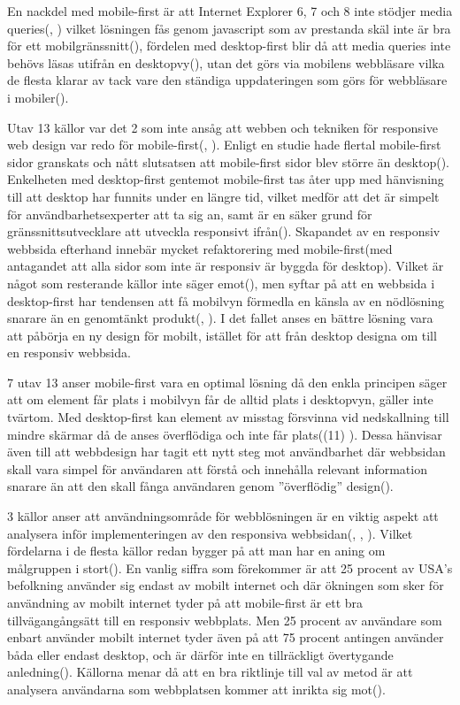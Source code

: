 \documentclass[11pt]{article}
\begin{document}
 En nackdel med mobile-first är att Internet Explorer 6, 7 och 8 inte stödjer media queries(\cite{marcuspope}, \cite{neocreo}) vilket lösningen fås genom javascript som av prestanda skäl inte är bra för ett mobilgränssnitt(\cite{responsivedesign}), fördelen med desktop-first blir då att media queries inte behövs läsas utifrån en desktopvy(\cite{neocreo}), utan det görs via mobilens webbläsare vilka de flesta klarar av tack vare den ständiga uppdateringen som görs för webbläsare i mobiler(\cite{webinsation}).
 
 Utav 13 källor var det 2 som inte ansåg att webben och tekniken för responsive web design var redo för mobile-first(\cite{cloudfour}, \cite{armstrong}). Enligt en studie hade flertal mobile-first sidor granskats och nått slutsatsen att mobile-first sidor blev större än desktop(\cite{cloudfour}). Enkelheten med desktop-first gentemot mobile-first tas åter upp med hänvisning till att desktop har funnits under en längre tid, vilket medför att det är simpelt för användbarhetsexperter att ta sig an, samt är en säker grund för gränssnittsutvecklare att utveckla responsivt ifrån(\cite{armstrong}). Skapandet av en responsiv webbsida efterhand innebär mycket refaktorering med mobile-first(med antagandet att alla sidor som inte är responsiv är byggda för desktop). Vilket är något som resterande källor inte säger emot(\cite{neocreo}), men syftar på att en webbsida i desktop-first har tendensen att få mobilvyn förmedla en känsla av en nödlösning snarare än en genomtänkt produkt(\cite{designshack}, \cite{othermedia}). I det fallet anses en bättre lösning vara att påbörja en ny design för mobilt, istället för att från desktop designa om till en responsiv webbsida.
 
7 utav 13 anser mobile-first vara en optimal lösning då den enkla principen säger att om element får plats i mobilvyn får de alltid plats i desktopvyn, gäller inte tvärtom. Med desktop-first kan element av misstag försvinna vid nedskallning till mindre skärmar då de anses överflödiga och inte får plats(\cite{blogskent}(11) \cite{responsivedesign}). Dessa hänvisar även till att webbdesign har tagit ett nytt steg mot användbarhet där webbsidan skall vara simpel för användaren att förstå och innehålla relevant information snarare än att den skall fånga användaren genom ”överflödig” design(\cite{blogskent}). 

3 källor anser att användningsområde för webblösningen är en viktig aspekt att analysera inför implementeringen av den responsiva webbsidan(\cite{neocreo}, \cite{marcuspope}, \cite{designshack}). Vilket fördelarna i de flesta källor redan bygger på att man har en aning om målgruppen i stort(\cite{zurbword}). En vanlig siffra som förekommer är att 25 procent av USA’s befolkning använder sig endast av mobilt internet och där ökningen som sker för användning av mobilt internet tyder på att mobile-first är ett bra tillvägangångsätt till en responsiv webbplats.  Men 25 procent av användare som enbart använder mobilt internet tyder även på att 75 procent antingen använder båda eller endast desktop, och är därför inte en tillräckligt övertygande anledning(\cite{marcuspope}). Källorna menar då att en bra riktlinje till val av metod är att analysera användarna som webbplatsen kommer att inrikta sig mot(\cite{neocreo}). 
\end{document}
